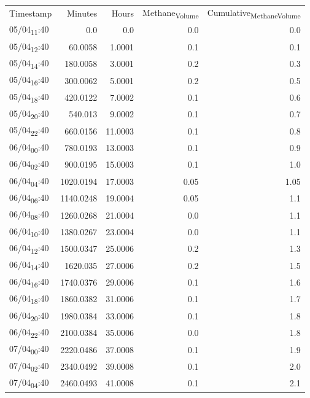 \documentclass[11pt]{article}
\begin{document}
\begin{center}
\begin{tabular}{lrrrr}
Timestamp & Minutes & Hours & Methane\textsubscript{Volume} & Cumulative\textsubscript{Methane}\textsubscript{Volume}\\[0pt]
05/04\textsubscript{11}:40 & 0.0 & 0.0 & 0.0 & 0.0\\[0pt]
05/04\textsubscript{12}:40 & 60.0058 & 1.0001 & 0.1 & 0.1\\[0pt]
05/04\textsubscript{14}:40 & 180.0058 & 3.0001 & 0.2 & 0.3\\[0pt]
05/04\textsubscript{16}:40 & 300.0062 & 5.0001 & 0.2 & 0.5\\[0pt]
05/04\textsubscript{18}:40 & 420.0122 & 7.0002 & 0.1 & 0.6\\[0pt]
05/04\textsubscript{20}:40 & 540.013 & 9.0002 & 0.1 & 0.7\\[0pt]
05/04\textsubscript{22}:40 & 660.0156 & 11.0003 & 0.1 & 0.8\\[0pt]
06/04\textsubscript{00}:40 & 780.0193 & 13.0003 & 0.1 & 0.9\\[0pt]
06/04\textsubscript{02}:40 & 900.0195 & 15.0003 & 0.1 & 1.0\\[0pt]
06/04\textsubscript{04}:40 & 1020.0194 & 17.0003 & 0.05 & 1.05\\[0pt]
06/04\textsubscript{06}:40 & 1140.0248 & 19.0004 & 0.05 & 1.1\\[0pt]
06/04\textsubscript{08}:40 & 1260.0268 & 21.0004 & 0.0 & 1.1\\[0pt]
06/04\textsubscript{10}:40 & 1380.0267 & 23.0004 & 0.0 & 1.1\\[0pt]
06/04\textsubscript{12}:40 & 1500.0347 & 25.0006 & 0.2 & 1.3\\[0pt]
06/04\textsubscript{14}:40 & 1620.035 & 27.0006 & 0.2 & 1.5\\[0pt]
06/04\textsubscript{16}:40 & 1740.0376 & 29.0006 & 0.1 & 1.6\\[0pt]
06/04\textsubscript{18}:40 & 1860.0382 & 31.0006 & 0.1 & 1.7\\[0pt]
06/04\textsubscript{20}:40 & 1980.0384 & 33.0006 & 0.1 & 1.8\\[0pt]
06/04\textsubscript{22}:40 & 2100.0384 & 35.0006 & 0.0 & 1.8\\[0pt]
07/04\textsubscript{00}:40 & 2220.0486 & 37.0008 & 0.1 & 1.9\\[0pt]
07/04\textsubscript{02}:40 & 2340.0492 & 39.0008 & 0.1 & 2.0\\[0pt]
07/04\textsubscript{04}:40 & 2460.0493 & 41.0008 & 0.1 & 2.1\\[0pt]

\end{tabular}
\end{center}
\end{document}
